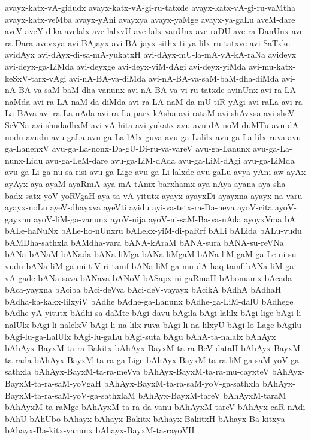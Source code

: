{avayx-katx-vA-gidudx
avayx-katx-vA-gi-ru-tatxde
avayx-katx-vA-gi-ru-vaMtha
avayx-katx-veMba
avayx-yAni
avayxya
avayx-yaMge
avayx-ya-gaLu
aveM-dare
aveV
aveY-dika
avelalx
ave-lalxvU
ave-lalx-vanUnx
ave-raDU
ave-ra-DanUnx
ave-ra-Dara
avevxya
avi-BAjayx
avi-BA-jayx-sithx-ti-ya-lilx-ru-tatxve
avi-SaTxke
avidAyx
avi-dAyx-di-sa-mA-yukatxH
avi-dAyx-mU-la-mA-yA-kA-raNa
avideyx
avi-deyx-ga-LiMda
avi-deyxge
avi-deyx-yiM-dAgi
avi-deyx-yiMda
avi-mu-katx-keSxV-tarx-vAgi
avi-nA-BA-va-diMda
avi-nA-BA-va-saM-baM-dha-diMda
avi-nA-BA-va-saM-baM-dha-vanunx
avi-nA-BA-va-vi-ru-tatxde
avinUnx
avi-ra-LA-naMda
avi-ra-LA-naM-da-diMda
avi-ra-LA-naM-da-mU-tiR-yAgi
avi-raLa
avi-ra-La-BAva
avi-ra-La-nAda
avi-ra-La-parx-kAsha
avi-rataM
avi-shAvxsa
avi-sheV-SeVNa
avi-shudadhxM
avi-vA-hita
avi-yukatx
avu
avu-dA-noM-duMTu
avu-dA-nodu
avudu
avu-gaLa
avu-ga-La-lAlx-guva
avu-ga-Lalilx
avu-ga-La-lilx-ruva
avu-ga-LanenxV
avu-ga-La-nonx-Da-gU-Di-ru-va-vareV
avu-ga-Lanunx
avu-ga-La-nunx-Lidu
avu-ga-LeM-dare
avu-ga-LiM-dAda
avu-ga-LiM-dAgi
avu-ga-LiMda
avu-ga-Li-ga-nu-sa-risi
avu-ga-Lige
avu-ga-Li-lalxde
avu-gaLu
avya-yAni
aw
ayAx
ayAyx
aya
ayaM
ayaRmA
aya-mA-tAmx-barxhamx
aya-nAya
ayana
aya-sha-badx-satx-yoV-yoRVgaH
aya-ta-vA-yitutx
ayayx
ayayxDi
ayayxna
ayayx-na-varu
ayayx-noLu
ayeV-dhayxva
ayeVti
ayidu
ayi-va-tetx-ra-Da-neya
ayoV-cita
ayoV-gayxnu
ayoV-liM-ga-vanunx
ayoV-nija
ayoV-ni-saM-Ba-va-nAda
ayoyxVma
bA
bALe-haNuNx
bALe-ho-nUnxru
bALekx-yiM-di-paRrf
bALi
bALida
bALu-vudu
bAMDha-sathxla
bAMdha-vara
bANA-kAraM
bANA-sura
bANA-su-reVNa
bANa
bANaM
bANada
bANa-liMga
bANa-liMgaM
bANa-liM-gaM-ga-Le-ni-su-vudu
bANa-liM-ga-mi-tiV-ri-tamf
bANa-liM-ga-mu-dA-haq-tamf
bANa-liM-ga-vA-gade
bANa-sava
bANava
bANoV
bASapx-ni-gaRmaH
bAbomamx
bAcada
bAca-yayxna
bAciba
bAci-deVva
bAci-deV-vayayx
bAcikA
bAdhA
bAdhaH
bAdha-ka-kakx-lilxyiV
bAdhe
bAdhe-ga-Lanunx
bAdhe-ga-LiM-dalU
bAdhege
bAdhe-yA-yitutx
bAdhi-sa-daMte
bAgi-davu
bAgila
bAgi-lalilx
bAgi-lige
bAgi-li-nalUlx
bAgi-li-nalelxV
bAgi-li-na-lilx-ruva
bAgi-li-na-lilxyU
bAgi-lo-Lage
bAgilu
bAgi-lu-ga-LalUlx
bAgi-lu-gaLu
bAgi-suta
bAgu
bAhA-ta-nalalx
bAhAyx
bAhAyx-BayxM-ta-ra-Bakitx
bAhAyx-BayxM-ta-ra-BeV-dataH
bAhAyx-BayxM-ta-rada
bAhAyx-BayxM-ta-ra-ga-Lige
bAhAyx-BayxM-ta-ra-liM-ga-saM-yoV-ga-sathxla
bAhAyx-BayxM-ta-ra-meVva
bAhAyx-BayxM-ta-ra-mu-cayxteV
bAhAyx-BayxM-ta-ra-saM-yoVgaH
bAhAyx-BayxM-ta-ra-saM-yoV-ga-sathxla
bAhAyx-BayxM-ta-ra-saM-yoV-ga-sathxlaM
bAhAyx-BayxM-tareV
bAhAyxM-taraM
bAhAyxM-ta-raMge
bAhAyxM-ta-ra-da-vanu
bAhAyxM-tareV
bAhAyx-caR-nAdi
bAhU
bAhUbo
bAhayx
bAhayx-Bakitx
bAhayx-BakitxH
bAhayx-Ba-kitxya
bAhayx-Ba-kitx-yanunx
bAhayx-BayxM-ta-rayoVH
}
